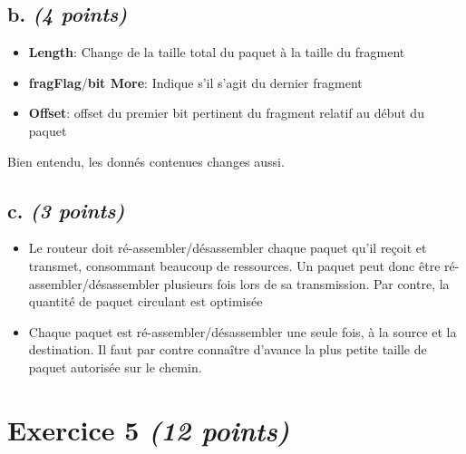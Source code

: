 \documentclass{article}
\begin{document}
\subsection{b. \emph{(4 points)}}
\begin{itemize}
    \item \textbf{Length}: Change de la taille total du paquet à la taille du fragment
    \item \textbf{fragFlag}/\textbf{bit More}: Indique s'il s'agit du dernier fragment
    \item \textbf{Offset}: offset du premier bit pertinent du fragment relatif au début du paquet
\end{itemize}
Bien entendu, les donnés contenues changes aussi.

\subsection{c. \emph{(3 points)}}
\begin{itemize}
    \item Le routeur doit ré-assembler/désassembler chaque paquet qu'il reçoit et transmet, consommant beaucoup de ressources. Un paquet peut donc être ré-assembler/désassembler plusieurs fois lors de sa transmission. Par contre, la quantité de paquet circulant est optimisée
    \item Chaque paquet est ré-assembler/désassembler une seule fois, à la source et la destination. Il faut par contre connaître d'avance la plus petite taille de paquet autorisée sur le chemin.
\end{itemize}

\clearpage

\section{Exercice 5 \emph{(12 points)}}


\end{document}
